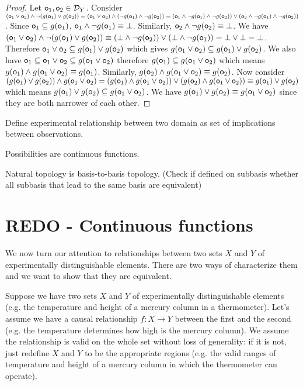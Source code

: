 \documentclass[11pt,letterpaper,fleqn]{memoir} %
\begin{document}
\begin{mathSection}
\begin{proof}
		Let $\mathsf{o}_1, \mathsf{o}_2 \in \mathcal{D}_Y$. Consider $(\mathsf{o}_1 \vee \mathsf{o}_2) \wedge \neg (g(\mathsf{o}_1) \vee g(\mathsf{o}_2)) = (\mathsf{o}_1 \vee \mathsf{o}_2) \wedge (\neg g(\mathsf{o}_1) \wedge \neg g(\mathsf{o}_2)) = (\mathsf{o}_1 \wedge \neg g(\mathsf{o}_1) \wedge \neg g(\mathsf{o}_2)) \vee (\mathsf{o}_2 \wedge \neg g(\mathsf{o}_1) \wedge \neg g(\mathsf{o}_2))$. Since $\mathsf{o}_1 \subseteq g(\mathsf{o}_1)$, $\mathsf{o}_1 \wedge \neg g(\mathsf{o}_1) \equiv \bot$. Similarly, $\mathsf{o}_2 \wedge \neg g(\mathsf{o}_2) \equiv \bot$. We have $(\mathsf{o}_1 \vee \mathsf{o}_2) \wedge \neg (g(\mathsf{o}_1) \vee g(\mathsf{o}_2)) \equiv (\bot \wedge \neg g(\mathsf{o}_2)) \vee (\bot \wedge \neg g(\mathsf{o}_1)) = \bot \vee \bot = \bot$. Therefore $\mathsf{o}_1 \vee \mathsf{o}_2 \subseteq g(\mathsf{o}_1) \vee g(\mathsf{o}_2)$ which gives $g(\mathsf{o}_1 \vee \mathsf{o}_2) \subseteq g(\mathsf{o}_1) \vee g(\mathsf{o}_2)$. We also have $\mathsf{o}_1 \subseteq \mathsf{o}_1 \vee \mathsf{o}_2 \subseteq g(\mathsf{o}_1 \vee \mathsf{o}_2)$ therefore $g(\mathsf{o}_1) \subseteq g(\mathsf{o}_1 \vee \mathsf{o}_2)$ which means $g(\mathsf{o}_1) \wedge g(\mathsf{o}_1 \vee \mathsf{o}_2) \equiv g(\mathsf{o}_1)$. Similarly, $g(\mathsf{o}_2) \wedge g(\mathsf{o}_1 \vee \mathsf{o}_2) \equiv g(\mathsf{o}_2)$. Now consider $(g(\mathsf{o}_1) \vee g(\mathsf{o}_2)) \wedge g(\mathsf{o}_1 \vee \mathsf{o}_2) = (g(\mathsf{o}_1) \wedge g(\mathsf{o}_1 \vee \mathsf{o}_2))\vee(g(\mathsf{o}_2) \wedge g(\mathsf{o}_1 \vee \mathsf{o}_2)) \equiv g(\mathsf{o}_1)\vee g(\mathsf{o}_2)$ which means $g(\mathsf{o}_1) \vee g(\mathsf{o}_2) \subseteq g(\mathsf{o}_1 \vee \mathsf{o}_2)$. We have $g(\mathsf{o}_1) \vee g(\mathsf{o}_2) \equiv g(\mathsf{o}_1 \vee \mathsf{o}_2)$ since they are both narrower of each other.
	\end{proof}
\end{mathSection}


Define experimental relationship between two domain as set of implications between observations.

Possibilities are continuous functions.

Natural topology is basis-to-basis topology. (Check if defined on subbasis whether all subbasis that lead to the same basis are equivalent)

\section{REDO - Continuous functions}

We now turn our attention to relationships between two sets $X$ and $Y$ of experimentally distinguishable elements. There are two ways of characterize them and we want to show that they are equivalent.

Suppose we have two sets $X$ and $Y$ of experimentally distinguishable elements (e.g. the temperature and height of a mercury column in a thermometer). Let's assume we have a causal relationship $f: X \rightarrow Y$ between the first and the second (e.g. the temperature determines how high is the mercury column). We assume the relationship is valid on the whole set without loss of generality: if it is not, just redefine $X$ and $Y$ to be the appropriate regions (e.g. the valid ranges of temperature and height of a mercury column in which the thermometer can operate).
\end{document}
